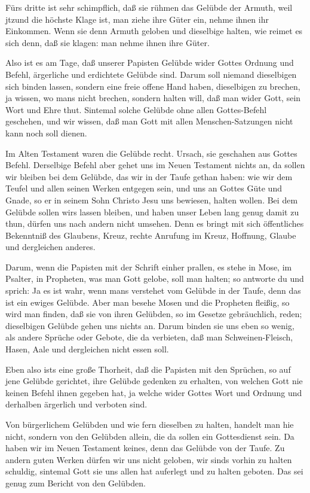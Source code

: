Fürs dritte ist sehr schimpflich, daß sie rühmen das Gelübde der Armuth, weil jtzund die höchste Klage ist, man ziehe ihre Güter ein, nehme ihnen ihr Einkommen. Wenn sie denn Armuth geloben und dieselbige halten, wie reimet es sich denn, daß sie klagen: man nehme ihnen ihre Güter.

Also ist es am Tage, daß unserer Papisten Gelübde wider Gottes Ordnung und Befehl, ärgerliche und erdichtete Gelübde sind. Darum soll niemand dieselbigen sich binden lassen, sondern eine freie offene Hand haben, dieselbigen zu brechen, ja wissen, wo mans nicht brechen, sondern halten will, daß man wider Gott, sein Wort und Ehre thut. Sintemal solche Gelübde ohne allen Gottes-Befehl geschehen, und wir wissen, daß man Gott mit allen Menschen-Satzungen nicht kann noch soll dienen.

Im Alten Testament waren die Gelübde recht. Ursach, sie geschahen aus Gottes Befehl. Derselbige Befehl aber gehet uns im Neuen Testament nichts an, da sollen wir bleiben bei dem Gelübde, das wir in der Taufe gethan haben: wie wir dem Teufel und allen seinen Werken entgegen sein, und uns an Gottes Güte und Gnade, so er in seinem Sohn Christo Jesu uns bewiesen, halten wollen. Bei dem Gelübde sollen wirs lassen bleiben, und haben unser Leben lang genug damit zu thun, dürfen uns nach andern nicht umsehen. Denn es bringt mit sich öffentliches Bekenntniß des Glaubens, Kreuz, rechte Anrufung im Kreuz, Hoffnung, Glaube und dergleichen anderes.

Darum, wenn die Papisten mit der Schrift einher prallen, es stehe in Mose, im Psalter, in Propheten, was man Gott gelobe, soll man halten; so antworte du und sprich: Ja es ist wahr, wenn mans verstehet vom Gelübde in der Taufe, denn das ist ein ewiges Gelübde. Aber man besehe Mosen und die Propheten fleißig, so wird man finden, daß sie von ihren Gelübden, so im Gesetze gebräuchlich, reden; dieselbigen Gelübde gehen uns nichts an. Darum binden sie uns eben so wenig, als andere Sprüche oder Gebote, die da verbieten, daß man Schweinen-Fleisch, Hasen, Aale und dergleichen nicht essen soll.

Eben also ists eine große Thorheit, daß die Papisten mit den Sprüchen, so auf jene Gelübde gerichtet, ihre Gelübde gedenken zu erhalten, von welchen Gott nie keinen Befehl ihnen gegeben hat, ja welche wider Gottes Wort und Ordnung und derhalben ärgerlich und verboten sind.

Von bürgerlichem Gelübden und wie fern dieselben zu halten, handelt man hie nicht, sondern von den Gelübden allein, die da sollen ein Gottesdienst sein. Da haben wir im Neuen Testament keines, denn das Gelübde von der Taufe. Zu andern guten Werken dürfen wir uns nicht geloben, wir sinds vorhin zu halten schuldig, sintemal Gott sie uns allen hat auferlegt und zu halten geboten. Das sei genug zum Bericht von den Gelübden.
